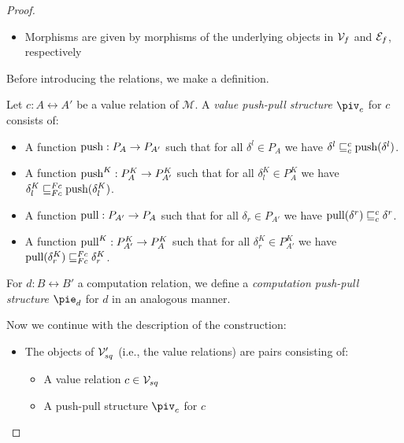 \begin{proof}
\begin{itemize}
      \item Morphisms are given by morphisms of the underlying objects in $\mathcal{V}_f$ and $\mathcal{E}_f$, respectively
   
    \end{itemize}

    Before introducing the relations, we make a definition.

    \begin{definition}
      Let $c : A \rel A'$ be a value relation of $\mathcal M$. A \emph{value push-pull structure} $\piv_c$ for $c$ consists of:
      \begin{itemize}
        \item A function $\text{push} : P_A \to P_{A'}$ 
              such that for all $\delta^l \in P_A$ we have $\delta^l \sqsubseteq_c^c \text{push}(\delta^l)$.
        \item A function $\text{push}^K : P^K_A \to P^K_{A'}$ 
              such that for all $\delta^K_l \in P^K_A$ we have $\delta^K_l \sqsubseteq_{Fc}^{Fc} \text{push}(\delta^K_l)$.
        \item A function $\text{pull} : P_{A'} \to P_A$
              such that for all $\delta_r \in P_{A'}$ we have $\text{pull}(\delta^r) \sqsubseteq_{c}^c \delta^r$.
        \item A function $\text{pull}^K : P^K_{A'} \to P^K_A$
              such that for all $\delta^K_r \in P^K_{A'}$ we have $\text{pull}(\delta^K_r) \sqsubseteq_{Fc}^{Fc} \delta^K_r$.
      \end{itemize}

      For $d : B \rel B'$ a computation relation, we define a \emph{computation push-pull structure} $\pie_d$ for $d$
      in an analogous manner.
    \end{definition}


    Now we continue with the description of the construction:
    \begin{itemize}

      \item The objects of $\mathcal{V}_{sq}'$ (i.e., the value relations) are pairs consisting of:
      \begin{itemize}
        \item A value relation $c \in \mathcal{V}_{sq}$
        \item A push-pull structure $\piv_c$ for $c$
      \end{itemize}


\end{itemize}
\end{proof}
